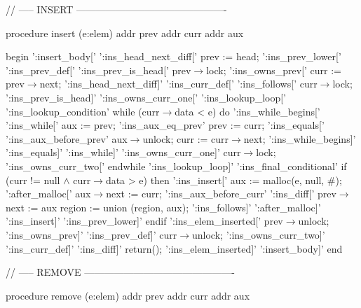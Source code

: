 //   -----   INSERT   ----------------------------------------------   
   
   
                  procedure   insert   (e:elem)   
                     addr   prev   
                     addr   curr   
                     addr   aux   
   
                  begin   
':insert\_body['   
':ins\_head\_next\_diff['   prev   :=   head;   
':ins\_prev\_lower['   
':ins\_prev\_def['   
':ins\_prev\_is\_head['     prev$\rightarrow$lock;   
':ins\_owns\_prev['         curr   :=   prev$\rightarrow$next;   
':ins\_head\_next\_diff]'   
':ins\_curr\_def['   
':ins\_follows['            curr$\rightarrow$lock;   
':ins\_prev\_is\_head]'   
':ins\_owns\_curr\_one['   
':ins\_lookup\_loop['   
':ins\_lookup\_condition'   while   (curr$\rightarrow$data   <   e)   do   
':ins\_while\_begins['   
':ins\_while['                aux   :=   prev;   
':ins\_aux\_eq\_prev'         prev   :=   curr;   
':ins\_equals['   
':ins\_aux\_before\_prev'     aux$\rightarrow$unlock;   
                              curr   :=   curr$\rightarrow$next;   
':ins\_while\_begins]'   
':ins\_equals]'   
':ins\_while]'   
':ins\_owns\_curr\_one]'      curr$\rightarrow$lock;   
':ins\_owns\_curr\_two['   endwhile   
':ins\_lookup\_loop]'   
':ins\_final\_conditional' if   (curr   !=   null   $\wedge$   curr$\rightarrow$data   >   e)   then   
':ins\_insert['                aux   :=   malloc(e,   null,   #);   
':after\_malloc['              aux$\rightarrow$next   :=   curr;   
':ins\_aux\_before\_curr'   
':ins\_diff['                  prev$\rightarrow$next   :=   aux                               
                               region   :=   union   (region,   {aux});      
':ins\_follows]'   
':after\_malloc]'   
':ins\_insert]'   
':ins\_prev\_lower]'       endif   
':ins\_elem\_inserted['    prev$\rightarrow$unlock;   
':ins\_owns\_prev]'   
':ins\_prev\_def]'         curr$\rightarrow$unlock;   
':ins\_owns\_curr\_two]'   
':ins\_curr\_def]'   
':ins\_diff]'            return();   
':ins\_elem\_inserted]'   
':insert\_body]'      end   
   
//   -----   REMOVE   ----------------------------------------------   
   
   
                  procedure   remove   (e:elem)   
                     addr   prev   
                     addr   curr   
                     addr   aux   


